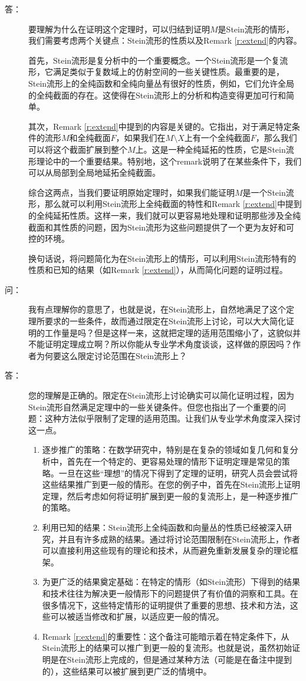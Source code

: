 \begin{description}
  \item[答：] 要理解为什么在证明这个定理时，可以归结到证明\(M\)是Stein流形的情形，我们需要考虑两个关键点：Stein流形的性质以及Remark \ref{r:extend}的内容。

首先，Stein流形是复分析中的一个重要概念。一个Stein流形是一个复流形，它满足类似于复数域上的仿射空间的一些关键性质。最重要的是，Stein流形上的全纯函数和全纯向量丛有很好的性质，例如，它们允许全局的全纯截面的存在。这使得在Stein流形上的分析和构造变得更加可行和简单。

其次，Remark \ref{r:extend}中提到的内容是关键的。它指出，对于满足特定条件的流形\(M\)和全纯截面\(F\)，如果我们在\(M\setminus X\)上有一个全纯截面\(F\)，那么我们可以将这个截面扩展到整个\(M\)上。这是一种全纯延拓的性质，它是Stein流形理论中的一个重要结果。特别地，这个remark说明了在某些条件下，我们可以从局部到全局地延拓全纯截面。

综合这两点，当我们要证明原始定理时，如果我们能证明\(M\)是一个Stein流形，那么就可以利用Stein流形上全纯截面的特性和Remark \ref{r:extend}中提到的全纯延拓性质。这样一来，我们就可以更容易地处理和证明那些涉及全纯截面和其性质的问题，因为Stein流形为这些问题提供了一个更为友好和可控的环境。

换句话说，将问题简化为在Stein流形上的情形，可以利用Stein流形特有的性质和已知的结果（如Remark \ref{r:extend}），从而简化问题的证明过程。
\item[问：] 我有点理解你的意思了，也就是说，在Stein流形上，自然地满足了这个定理所要求的一些条件，故而通过限定在Stein流形上讨论，可以大大简化证明的工作量是吗？但是这样一来，这就把定理的适用范围缩小了，这貌似并不能证明定理成立啊？所以你能从专业学术角度谈谈，这样做的原因吗？作者为何要这么限定讨论范围在Stein流形上？
\item[答：] 您的理解是正确的。限定在Stein流形上讨论确实可以简化证明过程，因为Stein流形自然满足定理中的一些关键条件。但您也指出了一个重要的问题：这种方法似乎限制了定理的适用范围。让我们从专业学术角度深入探讨这一点。
\begin{enumerate}
  \item 逐步推广的策略：在数学研究中，特别是在复杂的领域如复几何和复分析中，首先在一个特定的、更容易处理的情形下证明定理是常见的策略。一旦在这些“理想”的情况下得到了定理的证明，研究人员会尝试将这些结果推广到更一般的情形。在您的例子中，首先在Stein流形上证明定理，然后考虑如何将证明扩展到更一般的复流形上，是一种逐步推广的策略。
  \item 利用已知的结果：Stein流形上全纯函数和向量丛的性质已经被深入研究，并且有许多成熟的结果。通过将讨论范围限制在Stein流形上，作者可以直接利用这些现有的理论和技术，从而避免重新发展复杂的理论框架。
  \item 为更广泛的结果奠定基础：在特定的情形（如Stein流形）下得到的结果和技术往往为解决更一般情形下的问题提供了有价值的洞察和工具。在很多情况下，这些特定情形的证明提供了重要的思想、技术和方法，这些可以被适当修改和扩展，以适应更一般的情况。
  \item Remark \ref{r:extend}的重要性：这个备注可能暗示着在特定条件下，从Stein流形上的结果可以推广到更一般的复流形。也就是说，虽然初始证明是在Stein流形上完成的，但是通过某种方法（可能是在备注中提到的），这些结果可以被扩展到更广泛的情境中。
\end{enumerate}


\end{description}
